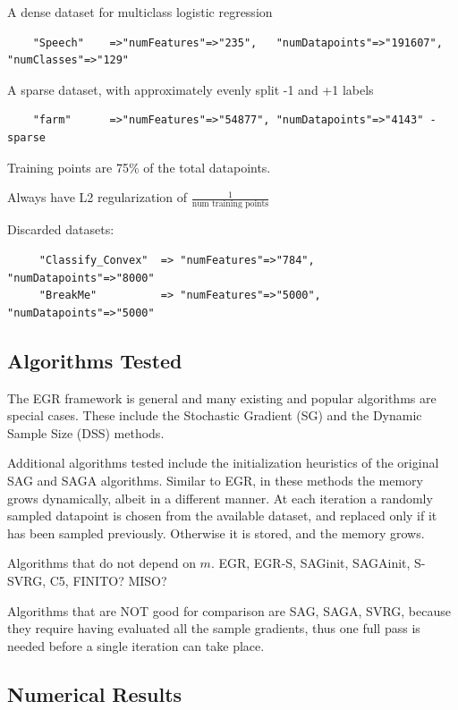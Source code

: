 \documentclass[11pt]{article}
\begin{document}
   A dense dataset for multiclass logistic regression
   \begin{verbatim}
    "Speech"    =>"numFeatures"=>"235",   "numDatapoints"=>"191607", "numClasses"=>"129"
   \end{verbatim}

   A sparse dataset, with approximately evenly split -1 and +1 labels 
   \begin{verbatim}
    "farm"      =>"numFeatures"=>"54877", "numDatapoints"=>"4143" - sparse
   \end{verbatim}

   Training points are 75\% of the total datapoints. 

   Always have L2 regularization of $\frac{1}{\mbox{num training points}}$

   Discarded datasets:
   \begin{verbatim}
     "Classify_Convex"  => "numFeatures"=>"784",  "numDatapoints"=>"8000"
     "BreakMe"          => "numFeatures"=>"5000", "numDatapoints"=>"5000"
   \end{verbatim}
   
   
   \subsection{Algorithms Tested}
   The EGR framework is general and many existing and popular algorithms are special cases. These include the Stochastic Gradient (SG) and the Dynamic Sample Size (DSS) methods. 
   
   Additional algorithms tested include the initialization heuristics of the original SAG and SAGA algorithms. Similar to EGR, in these methods the memory grows dynamically, albeit in a different manner. At each iteration a randomly sampled datapoint is chosen from the available dataset, and replaced only if it has been sampled previously. Otherwise it is stored, and the memory grows. 

   Algorithms that do not depend on $m$. EGR, EGR-S, SAGinit, SAGAinit, S-SVRG, C5, FINITO? MISO?
   
   Algorithms that are NOT good for comparison are SAG, SAGA, SVRG, because they require having evaluated all the sample gradients, thus one full pass is needed before a single iteration can take place. 
   
   \subsection{Numerical Results}
\end{document}
